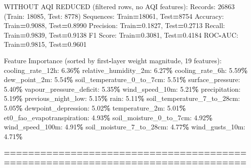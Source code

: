 \documentclass[
  letterpaper,
  DIV=11,
  numbers=noendperiod]{scrartcl}
\newenvironment{Shaded}{\begin{snugshade}}{\end{snugshade}}
\newcommand{\BuiltInTok}[1]{#1}
\newcommand{\DecValTok}[1]{\textcolor[rgb]{0.00,0.00,0.81}{#1}}
\newcommand{\FloatTok}[1]{\textcolor[rgb]{0.00,0.00,0.81}{#1}}
\newcommand{\NormalTok}[1]{#1}
\newcommand{\OperatorTok}[1]{\textcolor[rgb]{0.81,0.36,0.00}{\textbf{#1}}}
\begin{document}
\begin{Shaded}
\begin{Highlighting}[]
\NormalTok{WITHOUT AQI REDUCED (filtered rows, no AQI features):}
\NormalTok{  Records: }\DecValTok{26863}\NormalTok{ (Train: }\DecValTok{18085}\NormalTok{, Test: }\DecValTok{8778}\NormalTok{)}
\NormalTok{  Sequences: Train}\OperatorTok{=}\DecValTok{18061}\NormalTok{, Test}\OperatorTok{=}\DecValTok{8754}
\NormalTok{  Accuracy: Train}\OperatorTok{=}\FloatTok{0.9088}\NormalTok{, Test}\OperatorTok{=}\FloatTok{0.8990}
\NormalTok{  Precision: Train}\OperatorTok{=}\FloatTok{0.1827}\NormalTok{, Test}\OperatorTok{=}\FloatTok{0.2713}
\NormalTok{  Recall: Train}\OperatorTok{=}\FloatTok{0.9839}\NormalTok{, Test}\OperatorTok{=}\FloatTok{0.9138}
\NormalTok{  F1 Score: Train}\OperatorTok{=}\FloatTok{0.3081}\NormalTok{, Test}\OperatorTok{=}\FloatTok{0.4184}
\NormalTok{  ROC}\OperatorTok{{-}}\NormalTok{AUC: Train}\OperatorTok{=}\FloatTok{0.9815}\NormalTok{, Test}\OperatorTok{=}\FloatTok{0.9601}

\NormalTok{  Feature Importance (}\BuiltInTok{sorted}\NormalTok{ by first}\OperatorTok{{-}}\NormalTok{layer weight magnitude, }\DecValTok{19}\NormalTok{ features):}
\NormalTok{    cooling\_rate\_12h: }\FloatTok{6.36}\OperatorTok{\%}
\NormalTok{    relative\_humidity\_2m: }\FloatTok{6.27}\OperatorTok{\%}
\NormalTok{    cooling\_rate\_6h: }\FloatTok{5.59}\OperatorTok{\%}
\NormalTok{    dew\_point\_2m: }\FloatTok{5.54}\OperatorTok{\%}
\NormalTok{    soil\_temperature\_0\_to\_7cm: }\FloatTok{5.51}\OperatorTok{\%}
\NormalTok{    surface\_pressure: }\FloatTok{5.40}\OperatorTok{\%}
\NormalTok{    vapour\_pressure\_deficit: }\FloatTok{5.35}\OperatorTok{\%}
\NormalTok{    wind\_speed\_10m: }\FloatTok{5.21}\OperatorTok{\%}
\NormalTok{    precipitation: }\FloatTok{5.19}\OperatorTok{\%}
\NormalTok{    previous\_night\_low: }\FloatTok{5.15}\OperatorTok{\%}
\NormalTok{    rain: }\FloatTok{5.11}\OperatorTok{\%}
\NormalTok{    soil\_temperature\_7\_to\_28cm: }\FloatTok{5.05}\OperatorTok{\%}
\NormalTok{    dewpoint\_depression: }\FloatTok{5.02}\OperatorTok{\%}
\NormalTok{    temperature\_2m: }\FloatTok{5.01}\OperatorTok{\%}
\NormalTok{    et0\_fao\_evapotranspiration: }\FloatTok{4.93}\OperatorTok{\%}
\NormalTok{    soil\_moisture\_0\_to\_7cm: }\FloatTok{4.92}\OperatorTok{\%}
\NormalTok{    wind\_speed\_100m: }\FloatTok{4.91}\OperatorTok{\%}
\NormalTok{    soil\_moisture\_7\_to\_28cm: }\FloatTok{4.77}\OperatorTok{\%}
\NormalTok{    wind\_gusts\_10m: }\FloatTok{4.71}\OperatorTok{\%}

\OperatorTok{================================================================================}


\end{Highlighting}
\end{Shaded}
\end{document}
